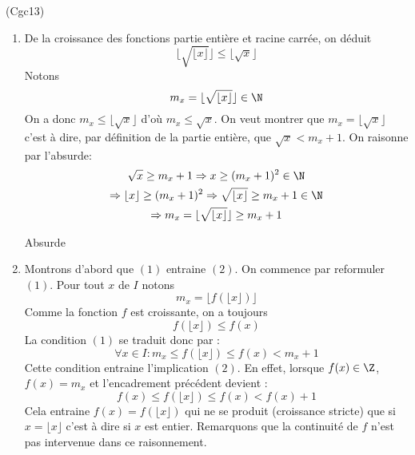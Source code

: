 \begin{tiny}(Cgc13)\end{tiny}
\begin{enumerate}
 \item De la croissance des fonctions partie entière et racine carrée, on déduit
\begin{displaymath}
  \lfloor \sqrt{\lfloor x \rfloor} \rfloor \leq \lfloor \sqrt{x} \rfloor
\end{displaymath}
Notons 
\begin{displaymath}
  m_x = \lfloor \sqrt{\lfloor x \rfloor} \rfloor \in \N
\end{displaymath}
On a donc $m_x \leq \lfloor \sqrt{x} \rfloor$ d'où $m_x\leq \sqrt{x}$. On veut montrer que $m_x = \lfloor \sqrt{x} \rfloor$ c'est à dire, par définition de la partie entière, que $\sqrt{x} < m_x +1$.
On raisonne par l'absurde:
\begin{multline*}
\sqrt{x}\geq m_x + 1 \Rightarrow x \geq (m_x+1)^2 \in \N \\
\Rightarrow \lfloor x \rfloor \geq (m_x+1)^2
\Rightarrow \sqrt{\lfloor x \rfloor} \geq m_x + 1 \in \N \\
\Rightarrow m_x = \lfloor \sqrt{\lfloor x \rfloor} \rfloor \geq m_x + 1
\end{multline*}

Absurde
 
 \item  Montrons d'abord que $(1)$ entraine $(2)$.\newline
On commence par reformuler $(1)$.\newline
Pour tout $x$ de $I$ notons
\begin{displaymath}
 m_x = \lfloor f(\lfloor x \rfloor)\rfloor
\end{displaymath}
Comme la fonction $f$ est croissante, on a toujours
\begin{displaymath}
 f(\lfloor x \rfloor) \leq f(x)
\end{displaymath}
La condition $(1)$ se traduit donc par :
\begin{displaymath}
 \forall x\in I : m_x\leq f(\lfloor x \rfloor) \leq f(x) < m_x +1
\end{displaymath}
Cette condition entraine l'implication $(2)$. En effet, lorsque $f(x)\in \Z$, $f(x)=m_x$ et l'encadrement précédent devient :
\begin{displaymath}
 f(x)\leq f(\lfloor x \rfloor) \leq f(x) < f(x) +1
\end{displaymath}
Cela entraine $f(x)=f(\lfloor x \rfloor)$ qui ne se produit (croissance stricte) que si $x=\lfloor x \rfloor$ c'est à dire si $x$ est entier.\newline
Remarquons que la continuité de $f$ n'est pas intervenue dans ce raisonnement.


\end{enumerate}
